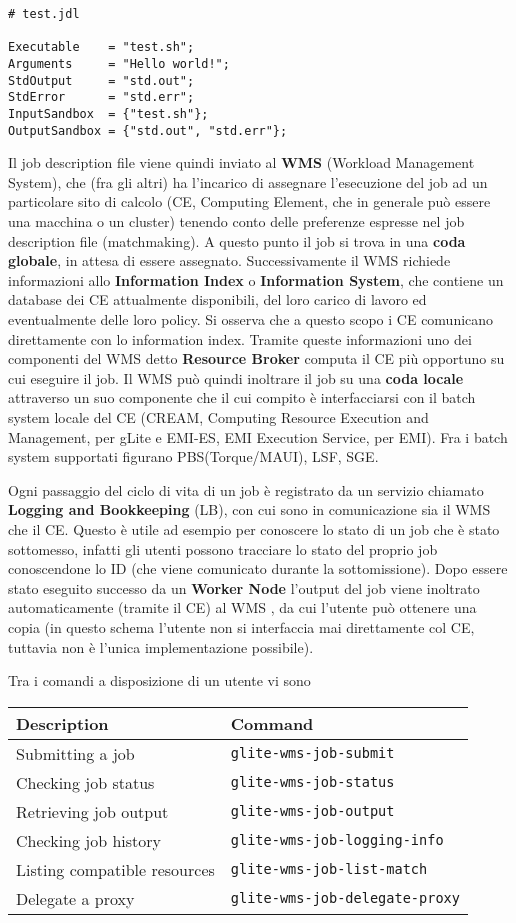 \documentclass[italian,]{article}
\begin{document}
\begin{verbatim}
# test.jdl

Executable    = "test.sh";
Arguments     = "Hello world!";
StdOutput     = "std.out";
StdError      = "std.err";
InputSandbox  = {"test.sh"};
OutputSandbox = {"std.out", "std.err"};
\end{verbatim}

Il job description file viene quindi inviato al \textbf{WMS} (Workload
Management System), che (fra gli altri) ha l'incarico di assegnare
l'esecuzione del job ad un particolare sito di calcolo (CE, Computing
Element, che in generale può essere una macchina o un cluster) tenendo
conto delle preferenze espresse nel job description file (matchmaking).
A questo punto il job si trova in una \textbf{coda globale}, in attesa
di essere assegnato. Successivamente il WMS richiede informazioni allo
\textbf{Information Index} o \textbf{Information System}, che contiene
un database dei CE attualmente disponibili, del loro carico di lavoro ed
eventualmente delle loro policy. Si osserva che a questo scopo i CE
comunicano direttamente con lo information index. Tramite queste
informazioni uno dei componenti del WMS detto \textbf{Resource Broker}
computa il CE più opportuno su cui eseguire il job. Il WMS può quindi
inoltrare il job su una \textbf{coda locale} attraverso un suo
componente che il cui compito è interfacciarsi con il batch system
locale del CE (CREAM, Computing Resource Execution and Management, per
gLite e EMI-ES, EMI Execution Service, per EMI). Fra i batch system
supportati figurano PBS(Torque/MAUI), LSF, SGE.

Ogni passaggio del ciclo di vita di un job è registrato da un servizio
chiamato \textbf{Logging and Bookkeeping} (LB), con cui sono in
comunicazione sia il WMS che il CE. Questo è utile ad esempio per
conoscere lo stato di un job che è stato sottomesso, infatti gli utenti
possono tracciare lo stato del proprio job conoscendone lo ID (che viene
comunicato durante la sottomissione). Dopo essere stato eseguito
successo da un \textbf{Worker Node} l'output del job viene inoltrato
automaticamente (tramite il CE) al WMS , da cui l'utente può ottenere
una copia (in questo schema l'utente non si interfaccia mai direttamente
col CE, tuttavia non è l'unica implementazione possibile).

Tra i comandi a disposizione di un utente vi sono

\begin{longtable}[]{@{}ll@{}}
\toprule
\textbf{Description} & \textbf{Command}\tabularnewline
\midrule
\endhead
Submitting a job & \texttt{glite-wms-job-submit}\tabularnewline
Checking job status & \texttt{glite-wms-job-status}\tabularnewline
Retrieving job output & \texttt{glite-wms-job-output}\tabularnewline
Checking job history &
\texttt{glite-wms-job-logging-info}\tabularnewline
Listing compatible resources &
\texttt{glite-wms-job-list-match}\tabularnewline
Delegate a proxy & \texttt{glite-wms-job-delegate-proxy}\tabularnewline
\bottomrule
\end{longtable}
\end{document}
